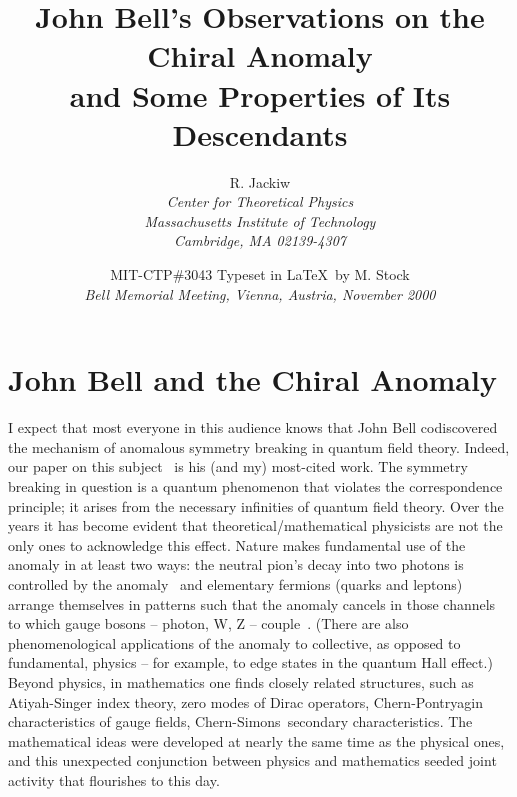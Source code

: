 \documentclass[a4paper,12pt,twoside]{article}
\newcommand{\CS}{Chern-Simons}
\begin{document}
 
\title{John Bell's Observations on the Chiral Anomaly\\
and Some Properties of Its Descendants}
\author{R. Jackiw\\
\small\it Center for Theoretical Physics\\ 
\small\it Massachusetts Institute of Technology\\ 
\small\it Cambridge, MA 02139-4307}
\date{\small MIT-CTP\#3043 \quad Typeset in \LaTeX\ by M. Stock\\[1ex]
\normalsize\itshape Bell Memorial Meeting, Vienna, Austria, November 2000}
\maketitle


\pagestyle{myheadings}
\thispagestyle{empty}


\section{John Bell and the Chiral Anomaly}

I expect that most everyone in this audience knows that John Bell codiscovered the
mechanism of anomalous symmetry breaking in quantum field theory. Indeed, our
paper on this subject~\cite{ref1} is his (and my) most-cited work. The symmetry
breaking in question is a quantum phenomenon that violates the correspondence
principle; it arises from the necessary infinities of quantum field theory. Over the
years it has become evident that theoretical/mathematical physicists are not the only
ones to acknowledge this effect. Nature makes fundamental use of the anomaly in at
least two ways: the neutral pion's decay into two photons is controlled by the
anomaly~\cite{ref1,ref2} and elementary fermions (quarks and leptons) arrange
themselves in patterns such that the anomaly cancels in those channels to which
gauge bosons -- photon, W,  Z  -- couple~\cite{ref3}. (There are also phenomenological
applications of the anomaly to collective, as opposed to fundamental, physics -- for
example, to edge states in the quantum Hall  effect.) Beyond physics, in mathematics
one finds closely related structures, such as Atiyah-Singer index theory, zero modes
of Dirac operators, Chern-Pontryagin characteristics of gauge fields, \CS\ secondary
characteristics. The mathematical ideas were developed at nearly the same time as
the physical ones, and this unexpected conjunction between physics and mathematics
seeded joint activity that flourishes to this day. 
\end{document}
